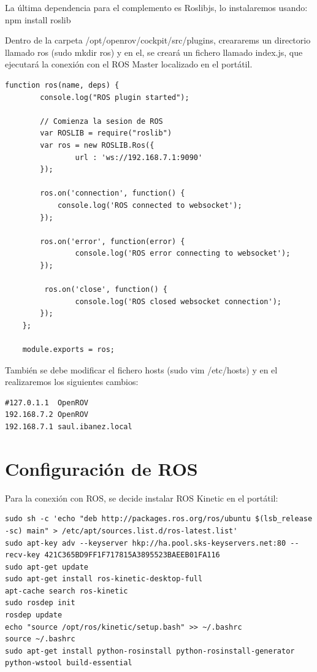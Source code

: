 La última dependencia para el complemento es Roslibjs, lo instalaremos usando: npm install roslib

Dentro de la carpeta /opt/openrov/cockpit/src/plugins, creararems un directorio llamado ros (sudo mkdir ros) y en el, se creará un fichero llamado index.js, que ejecutará la conexión con el ROS Master localizado en el portátil.
\newpage
\renewcommand{\lstlistingname}{}
\begin{lstlisting}[caption=Conexión con ROS, label={lst:conection_ros}]
function ros(name, deps) {
  		console.log("ROS plugin started");

  		// Comienza la sesion de ROS
 		var ROSLIB = require("roslib")
  		var ros = new ROSLIB.Ros({
    			url : 'ws://192.168.7.1:9090'
  		});

  		ros.on('connection', function() {
   			console.log('ROS connected to websocket');
  		});

  		ros.on('error', function(error) {
    			console.log('ROS error connecting to websocket');
  		});

 		 ros.on('close', function() {
    			console.log('ROS closed websocket connection');
 		});
	};

	module.exports = ros;
\end{lstlisting}

También se debe modificar el fichero hosts (sudo vim /etc/hosts) y en el realizaremos los siguientes cambios:

\begin{lstlisting}[caption=/etc/hosts, label={lst:hosts}]
#127.0.1.1	OpenROV
192.168.7.2	OpenROV
192.168.7.1	saul.ibanez.local
\end{lstlisting}

\section{Configuración de ROS}
\label{cap:Configuracion de ROS}
Para la conexión con ROS, se decide instalar ROS Kinetic en el portátil:

\begin{lstlisting}[caption=Instalacion de ROS, label={lst:install_ros}]
sudo sh -c 'echo "deb http://packages.ros.org/ros/ubuntu $(lsb_release -sc) main" > /etc/apt/sources.list.d/ros-latest.list'
sudo apt-key adv --keyserver hkp://ha.pool.sks-keyservers.net:80 --recv-key 421C365BD9FF1F717815A3895523BAEEB01FA116
sudo apt-get update
sudo apt-get install ros-kinetic-desktop-full
apt-cache search ros-kinetic
sudo rosdep init
rosdep update
echo "source /opt/ros/kinetic/setup.bash" >> ~/.bashrc
source ~/.bashrc
sudo apt-get install python-rosinstall python-rosinstall-generator python-wstool build-essential
\end{lstlisting}

